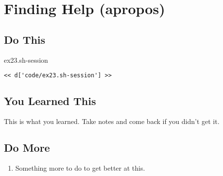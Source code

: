 \chapter{Finding Help (apropos)}

\section{Do This}

\begin{code}{ex23.sh-session}
\begin{Verbatim}
<< d['code/ex23.sh-session'] >>
\end{Verbatim}
\end{code}


\section{You Learned This}

This is what you learned.  Take notes and come back if you didn't get it.

\section{Do More}

\begin{enumerate}
\item Something more to do to get better at this.
\end{enumerate}

